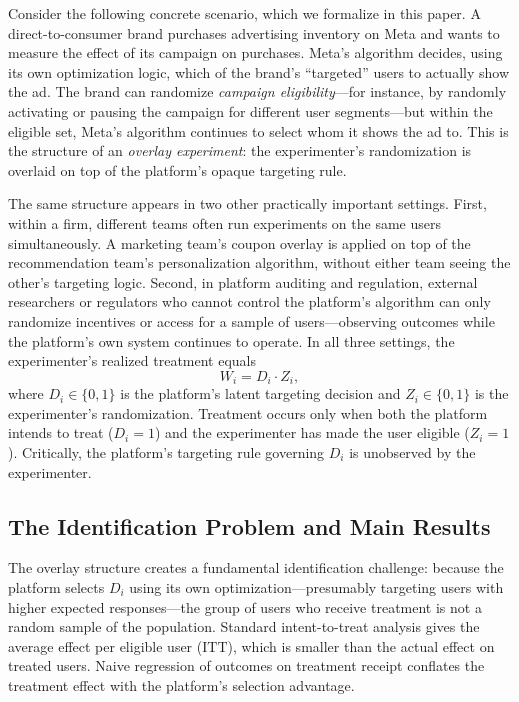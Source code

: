 \documentclass[12pt]{article}
\newcommand{\ITT}{\mathrm{ITT}}
\begin{document}
Consider the following concrete scenario, which we formalize in this paper.
A direct-to-consumer brand purchases advertising inventory on Meta and wants
to measure the effect of its campaign on purchases. Meta's algorithm
decides, using its own optimization logic, which of the brand's
``targeted'' users to actually show the ad. The brand can randomize
\emph{campaign eligibility}---for instance, by randomly activating or
pausing the campaign for different user segments---but within the eligible
set, Meta's algorithm continues to select whom it shows the ad to. This
is the structure of an \emph{overlay experiment}: the experimenter's
randomization is overlaid on top of the platform's opaque targeting rule.

The same structure appears in two other practically important settings.
First, within a firm, different teams often run experiments on the same
users simultaneously. A marketing team's coupon overlay is applied on top
of the recommendation team's personalization algorithm, without either
team seeing the other's targeting logic. Second, in platform auditing and
regulation, external researchers or regulators who cannot control the
platform's algorithm can only randomize incentives or access for a sample
of users---observing outcomes while the platform's own system continues to
operate. In all three settings, the experimenter's realized treatment
equals
\begin{equation}
  W_i = D_i \cdot Z_i,
  \label{eq:overlay}
\end{equation}
where $D_i \in \{0,1\}$ is the platform's latent targeting decision and
$Z_i \in \{0,1\}$ is the experimenter's randomization. Treatment occurs
only when both the platform intends to treat ($D_i=1$) and the
experimenter has made the user eligible ($Z_i=1$). Critically, the
platform's targeting rule governing $D_i$ is unobserved by the experimenter.

\subsection*{The Identification Problem and Main Results}

The overlay structure creates a fundamental identification challenge: because
the platform selects $D_i$ using its own optimization---presumably targeting
users with higher expected responses---the group of users who receive
treatment is not a random sample of the population. Standard intent-to-treat
analysis gives the average effect per eligible user ($\ITT$), which is
smaller than the actual effect on treated users. Naive regression of outcomes
on treatment receipt conflates the treatment effect with the platform's
selection advantage.
\end{document}
